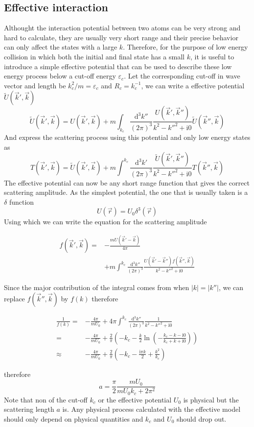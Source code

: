 \documentclass[aps,twocolumn,secnumarabic,balancelastpage,amsmath,amssymb,nofootinbib]{revtex4}
\newcommand{\ud}{\mathrm{d}}
\newcommand{\ui}{\mathrm{i}}
\newcommand{\eqar}[1]
{
  \begin{align*}
    #1
  \end{align*}
}
\newcommand{\paren}[1]{{\left({#1}\right)}}
\newcommand{\abs}[1]{{\left|{#1}\right|}}
\begin{document}
\subsection{Effective interaction}
Althought the interaction potential between two atoms can be very strong and hard to calculate, they are usually very short range and their precise behavior can only affect the states with a large $k$. Therefore, for the purpose of low energy collision in which both the initial and final state has a small $k$, it is useful to introduce a simple effective potential that can be used to describe these low energy process below a cut-off energy $\varepsilon_c$. Let the corresponding cut-off in wave vector and length be $k_c^2/m=\varepsilon_c$ and $R_c=k_c^{-1}$, we can write a effective potential $\tilde U\paren{\vec k', \vec k}$
\[\tilde U\paren{\vec k', \vec k}=U\paren{\vec k', \vec k}+m\int_{k_c}\!\!\frac{\ud^3 k''}{\paren{2\pi}^3}\frac{U\paren{\vec k', \vec k''}}{k^2-k''^2+\ui 0}\tilde U\paren{\vec k'', \vec k}\]
And express the scattering process using this potential and only low energy states as
\[T\paren{\vec k', \vec k}=\tilde U\paren{\vec k', \vec k}+m\int^{k_c}\!\!\frac{\ud^3 k'}{\paren{2\pi}^3}\frac{\tilde U\paren{\vec k', \vec k''}}{k^2-k''^2+\ui0}T\paren{\vec k'', \vec k}\]
The effective potential can now be any short range function that gives the correct scattering amplitude. As the simplest potential, the one that is usually taken is a $\delta$ function
\[U\paren{\vec r}=U_0\delta^3\paren{\vec r}\]
Using which we can write the equation for the scattering amplitude
\eqar{
  f\paren{\vec k', \vec k}=&-\frac{mU\paren{\vec k'-\vec k}}{4\pi}\\
  &+m\int^{k_c}\!\!\frac{\ud^3k''}{\paren{2\pi}^3}\frac{U\paren{\vec k'-\vec k''}f\paren{\vec k'',\vec k}}{k^2-k''^2+\ui0}
}
Since the major contribution of the integral comes from when $\abs{k}=\abs{k''}$, we can replace $f\paren{\vec k'', \vec k}$ by $f\paren{k}$ therefore
\eqar{
  \frac{1}{f\paren{k}}=&-\frac{4\pi}{mU_0}+4\pi\int^{k_c}\frac{\ud^3k''}{\paren{2\pi}^3}\frac{1}{k^2-k''^2+\ui0}\\
  =&-\frac{4\pi}{mU_0}+\frac{2}{\pi}\paren{-k_c-\frac{k}{2}\ln\paren{-\frac{k_c-k-\ui0}{k_c+k+\ui0}}}\\
  \approx&-\frac{4\pi}{mU_0}+\frac{2}{\pi}\paren{-k_c-\frac{\ui\pi k}{2}+\frac{k^2}{k_c}}
}
therefore
\[a=\frac{\pi}{2}\frac{mU_0}{mU_0k_c+2\pi^2}\]
Note that non of the cut-off $k_c$ or the effective potential $U_0$ is physical but the scattering length $a$ is. Any physical process calculated with the effective model should only depend on physical quantities and $k_c$ and $U_0$ should drop out.
\end{document}
